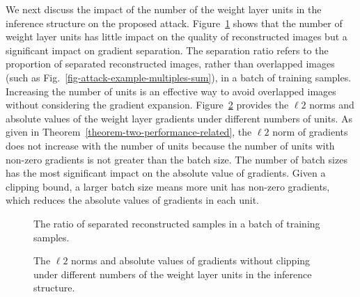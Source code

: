\documentclass[lettersize,journal]{IEEEtran}
\begin{document}
We next discuss the impact of the number of the weight layer units in the inference structure on the proposed attack. Figure~\ref{fig-evaluation-performance-bin-num} shows that the number of weight layer units has little impact on the quality of reconstructed images but a significant impact on gradient separation. The separation ratio refers to the proportion of separated reconstructed images, rather than overlapped images (such as Fig.~\ref{fig-attack-example-multiples-sum}), in a batch of training samples. Increasing the number of units is an effective way to avoid overlapped images without considering the gradient expansion. Figure~\ref{fig-evaluation-performance-bin-num-norm} provides the $\ell2$ norms and absolute values of the weight layer gradients under different numbers of units. As given in Theorem~\ref{theorem-two-performance-related}, the $\ell2$ norm of gradients does not increase with the number of units because the number of units with non-zero gradients is not greater than the batch size. The number of batch sizes has the most significant impact on the absolute value of gradients. Given a clipping bound, a larger batch size means more unit has non-zero gradients, which reduces the absolute values of gradients in each unit.

\begin{figure}
\centering
{}\hspace{-0.1in}
\caption{The ratio of separated reconstructed samples in a batch of training samples.}
\label{fig-evaluation-performance-bin-num}
\end{figure}

\begin{figure}
\centering
{}\hspace{-0.1in}
\caption{The $\ell2$ norms and absolute values of gradients without clipping under different numbers of the weight layer units in the inference structure.}
\label{fig-evaluation-performance-bin-num-norm}
\end{figure}
\end{document}
